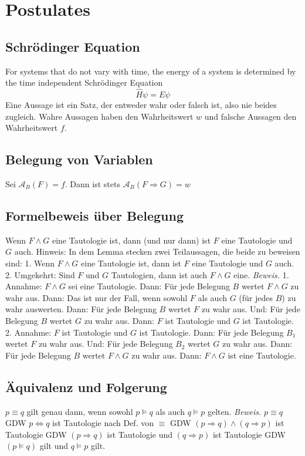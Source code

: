 \section{Postulates}
\subsection*{Schrödinger Equation}
For systems that do not vary with time, the energy of a system is determined by the time independent Schrödinger Equation \\
\begin{equation}
    \hat{H}\psi = E\psi
\end{equation}
Eine Aussage ist ein Satz, der entweder wahr oder falsch ist, also nie beides zugleich.
Wahre Aussagen haben den Wahrheitswert $w$ und falsche Aussagen den
Wahrheitswert $f$.
\subsection*{Belegung von Variablen}
Sei $\mathcal{A}_B(F) = f$.
Dann ist stets $\mathcal{A}_B(F\Rightarrow G) = w$
\subsection*{Formelbeweis über Belegung}
Wenn $F \wedge G$ eine Tautologie ist, dann (und nur dann) ist $F$ eine Tautologie und $G$ auch.
Hinweis: In dem Lemma stecken zwei Teilaussagen, die beide zu beweisen sind:
1. Wenn $F \wedge G$ eine Tautologie ist, dann ist $F$ eine Tautologie und $G$ auch.
2. Umgekehrt: Sind $F$ und $G$ Tautologien, dann ist auch $F \wedge G$ eine.
\emph{Beweis.}
1. Annahme: $F \wedge G$ sei eine Tautologie.
Dann: Für jede Belegung $B$ wertet $F \wedge G$ zu wahr aus.
Dann: Das ist nur der Fall, wenn sowohl $F$ als auch $G$ (für jedes $B$) zu wahr auswerten.
Dann: Für jede Belegung $B$ wertet $F$ zu wahr aus. Und:
Für jede Belegung $B$ wertet $G$ zu wahr aus.
Dann: $F$ ist Tautologie und $G$ ist Tautologie.
2. Annahme: $F$ ist Tautologie und $G$ ist Tautologie.
Dann: Für jede Belegung $B_1$ wertet $F$ zu wahr aus. Und: Für jede Belegung $B_2$ wertet $G$ zu wahr aus.
Dann: Für jede Belegung $B$ wertet $F \wedge G$ zu wahr aus.
Dann: $F \wedge G$ ist eine Tautologie.
\subsection*{Äquivalenz und Folgerung}
$p\equiv q$ gilt genau dann, wenn sowohl $p\models q$ als auch $q\models p$ gelten. \emph{Beweis.}
$p\equiv q$ GDW $p\Leftrightarrow q$ ist Tautologie nach Def. von $\equiv$
GDW $(p\Rightarrow q) \wedge (q\Rightarrow p)$ ist Tautologie
GDW $(p\Rightarrow q)$ ist Tautologie und $(q\Rightarrow p)$ ist Tautologie
GDW $(p\models q)$ gilt und $q\models p$ gilt.
